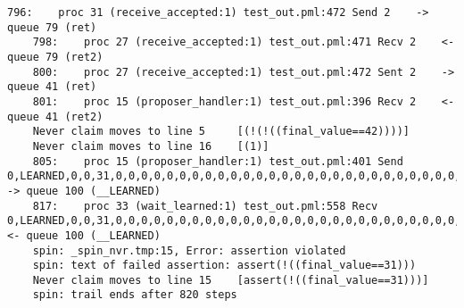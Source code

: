 \begin{lstlisting}[xleftmargin=.01\linewidth, xrightmargin=0.01\linewidth, caption={Message passing caused by the proposer's protocol bug.}, label={lst:paxos_bug}]
    796:    proc 31 (receive_accepted:1) test_out.pml:472 Send 2    -> queue 79 (ret)
    798:    proc 27 (receive_accepted:1) test_out.pml:471 Recv 2    <- queue 79 (ret2)
    800:    proc 27 (receive_accepted:1) test_out.pml:472 Sent 2    -> queue 41 (ret)
    801:    proc 15 (proposer_handler:1) test_out.pml:396 Recv 2    <- queue 41 (ret2)
    Never claim moves to line 5     [(!(!((final_value==42))))]
    Never claim moves to line 16    [(1)]
    805:    proc 15 (proposer_handler:1) test_out.pml:401 Send 0,LEARNED,0,0,31,0,0,0,0,0,0,0,0,0,0,0,0,0,0,0,0,0,0,0,0,0,0,0,0,0,0,0,0,0,0,0,0,0   -> queue 100 (__LEARNED)
    817:    proc 33 (wait_learned:1) test_out.pml:558 Recv 0,LEARNED,0,0,31,0,0,0,0,0,0,0,0,0,0,0,0,0,0,0,0,0,0,0,0,0,0,0,0,0,0,0,0,0,0,0,0,0       <- queue 100 (__LEARNED)
    spin: _spin_nvr.tmp:15, Error: assertion violated
    spin: text of failed assertion: assert(!((final_value==31)))
    Never claim moves to line 15    [assert(!((final_value==31)))]
    spin: trail ends after 820 steps
\end{lstlisting}